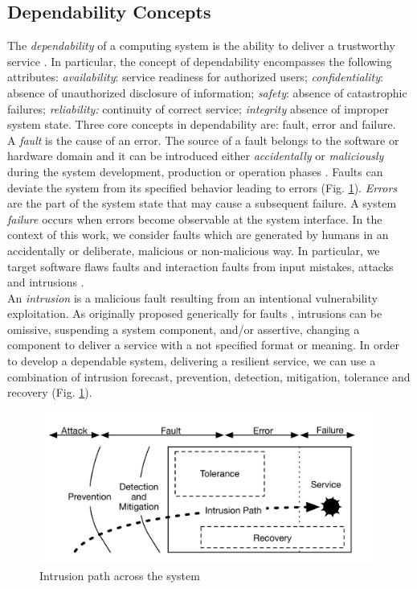 
\subsection{Dependability Concepts}
\label{subsec:fault}
 The \emph{dependability} of a computing system is the ability to deliver a trustworthy service \cite{Aviz}. In particular, the concept of dependability encompasses the following attributes: \emph{availability}: service readiness for authorized users; \emph{confidentiality}: absence of unauthorized disclosure of information; \emph{safety}: absence of catastrophic failures; \emph{reliability:} continuity of correct service; \emph{integrity} absence of improper system state. Three core concepts in dependability are: fault, error and failure.\\

A \emph{fault} is the cause of an error. The source of a fault belongs to the software or hardware domain and it can be introduced either \emph{accidentally} or \emph{maliciously} during the system development, production or operation phases \cite{Landwehr1992,Aviz}. Faults can deviate the system from its specified behavior leading to errors (Fig. \ref{fig:intrusion_path}). \emph{Errors} are the part of the system state that may cause a subsequent failure. A system \emph{failure} occurs when errors become observable at the system interface. In the context of this work, we consider faults which are generated by humans in an accidentally or deliberate, malicious or non-malicious way. In particular, we target software flaws faults and interaction faults from input mistakes, attacks and intrusions \cite{Aviz}. \\  

An \emph{intrusion} is a malicious fault resulting from an intentional vulnerability exploitation. As originally proposed generically for faults \cite{Aviz,Powell1992}, intrusions can be omissive, suspending a system component, and/or assertive, changing a component to deliver a service with a not specified format or meaning. In order to develop a dependable system, delivering a resilient service, we can use a combination of intrusion forecast, prevention, detection, mitigation, tolerance and recovery (Fig. \ref{fig:intrusion_path}). \\

\begin{figure}
  \centering
  \includegraphics[width=110mm]{images/intrusion}
  \caption{Intrusion path across the system}
  \label{fig:intrusion_path}
\end{figure}

